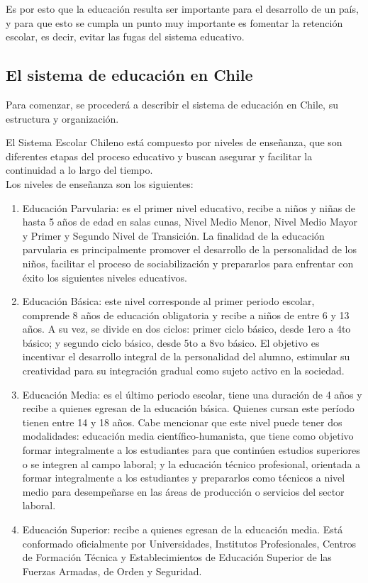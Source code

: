 Es por esto que la educación resulta ser importante para el desarrollo de un país, y para que esto se cumpla un punto muy importante es fomentar la retención escolar, es decir, evitar las fugas del sistema educativo. 

\subsection{El sistema de educación en Chile}
Para comenzar, se procederá a describir el sistema de educación en Chile, su estructura y organización.

El Sistema Escolar Chileno está compuesto por niveles de enseñanza, que son diferentes etapas del proceso educativo y buscan asegurar y facilitar la continuidad a lo largo del tiempo. \\

Los niveles de enseñanza son los siguientes:

\begin{enumerate}
    \item Educación Parvularia: es el primer nivel educativo, recibe a niños y niñas de hasta 5 años de edad en salas cunas, Nivel Medio Menor, Nivel Medio Mayor y Primer y Segundo  Nivel de Transición. 
    La finalidad de la educación parvularia es principalmente promover el desarrollo de la personalidad de los niños, facilitar el proceso de sociabilización y prepararlos para enfrentar con éxito los siguientes niveles educativos.
    \item Educación Básica: este nivel corresponde al primer periodo escolar, comprende 8 años de educación obligatoria y recibe a niños de entre 6 y 13 años. A su vez, se divide en dos ciclos: primer ciclo básico, desde 1ero a 4to básico; y segundo ciclo básico, desde 5to a 8vo básico.
    El objetivo es incentivar el desarrollo integral de la personalidad del alumno, estimular su creatividad para su integración gradual como sujeto activo en la sociedad.
    \item Educación Media: es el último periodo escolar, tiene una duración de 4 años y recibe a quienes egresan de la educación básica. Quienes cursan este período tienen entre 14 y 18 años. Cabe mencionar que este nivel puede tener dos modalidades: educación media científico-humanista, que tiene como objetivo formar integralmente a los estudiantes para que continúen estudios superiores o se integren al campo laboral; y la educación técnico profesional, orientada a formar integralmente a los estudiantes y prepararlos como técnicos a nivel medio para desempeñarse en las áreas de producción o servicios del sector laboral.
    \item Educación Superior: recibe a quienes egresan de la educación media. Está conformado oficialmente por Universidades, Institutos Profesionales, Centros de Formación Técnica y Establecimientos de Educación Superior de las Fuerzas Armadas, de Orden y Seguridad. 
\end{enumerate}

